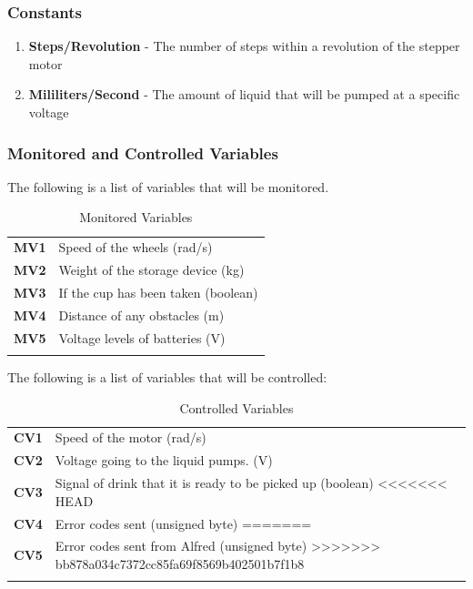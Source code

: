 \documentclass [11pt]{article}
\begin{document}
\subsubsection{Constants}
\begin{enumerate}
	\itemsep0pt
	\item \textbf{Steps/Revolution} -  The number of steps within a revolution of the stepper motor
	\item \textbf{Mililiters/Second} - The amount of liquid that will be pumped at a specific voltage
\end{enumerate}


\subsubsection{Monitored and Controlled Variables}

The following is a list of variables that will be monitored.

\begin{longtable}{ |p{ }  p{ }|}
\hline

\textbf{MV1} &  Speed of the wheels (rad/s)\\

\cellcolor{tableCell}\textbf{MV2} &  \cellcolor{tableCell}Weight of the storage device (kg)\\ 

\textbf{MV3} &  If the cup has been taken (boolean)\\

\cellcolor{tableCell}\textbf{MV4} &  \cellcolor{tableCell}Distance of any obstacles (m)\\ 

\textbf{MV5} &  Voltage levels of batteries (V)\\
\hline

\caption{Monitored Variables}
\end{longtable}


The following is a list of variables that will be controlled:

\begin{longtable}{ |p{ }  p{ }|}
\hline

\textbf{CV1} &  Speed of the motor (rad/s)\\

\cellcolor{tableCell}\textbf{CV2} &  \cellcolor{tableCell}Voltage going to the liquid pumps. (V)\\ 

\textbf{CV3} &  Signal of drink that it is ready to be picked up (boolean) <<<<<<< HEAD\\

\cellcolor{tableCell}\textbf{CV4} &  \cellcolor{tableCell}Error codes sent (unsigned byte) =======\\ 

\textbf{CV5} &  Error codes sent from Alfred (unsigned byte) >>>>>>> bb878a034c7372cc85fa69f8569b402501b7f1b8\\
\hline

\caption{Controlled Variables}
\end{longtable}
\end{document}
